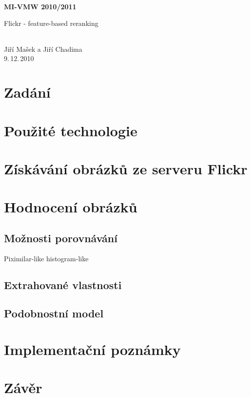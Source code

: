 \documentclass[12pt,oneside,a4paper]{article}
\begin{document}
\begin{center}
\bf MI-VMW 2010/2011\\[2mm]
    \begin{Large}Flickr - feature-based reranking\end{Large}\\[3mm]
       Jiří Mašek a Jiří Chadima\\
9.\,12.\,2010
\end{center}

\section{Zadání}

\section{Použité technologie}

\section{Získávání obrázků ze serveru Flickr}

\section{Hodnocení obrázků}
\subsection{Možnosti porovnávání}
Piximilar-like
histogram-like
\subsection{Extrahované vlastnosti}
\subsection{Podobnostní model}

\section{Implementační poznámky}

\section{Závěr}

\renewcommand{\refname}{Literatura}

{
 
}
\end{document}
